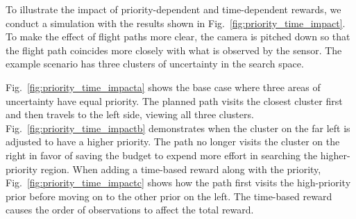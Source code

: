 
    

To illustrate the impact of priority-dependent and time-dependent rewards, we conduct a simulation with the results shown in Fig.~\ref{fig:priority_time_impact}. To make the effect of flight paths more clear, the camera is pitched down so that the flight path coincides more closely with what is observed by the sensor. The example scenario has three clusters of uncertainty in the search space.

Fig.~\ref{fig:priority_time_impacta} shows the base case where three areas of uncertainty have equal priority. The planned path visits the closest cluster first and then travels to the left side, viewing all three clusters. Fig.~\ref{fig:priority_time_impactb} demonstrates when the cluster on the far left is adjusted to have a higher priority. The path no longer visits the cluster on the right in favor of saving the budget to expend more effort in searching the higher-priority region.  When adding a time-based reward along with the priority, Fig.~\ref{fig:priority_time_impactc} shows how the path first visits the high-priority prior before moving on to the other prior on the left. The time-based reward causes the order of observations to affect the total reward. 




